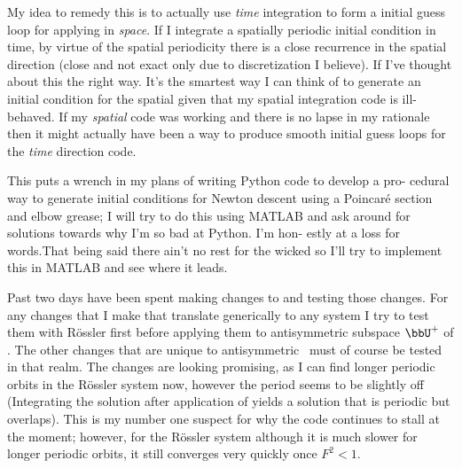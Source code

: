 My idea to remedy this is to actually use \emph{time} integration to form a initial guess loop for applying {\descent} in \emph{space}. If I integrate a spatially periodic initial condition in time, by virtue of the spatial periodicity there is a close recurrence in the spatial direction (close and not exact only due to discretization I believe). If I've thought about this the right way. It's the smartest way I can think of to generate an initial condition for the spatial {\descent}  given that my spatial integration code is ill-behaved. If my \emph{spatial} code was working and there is no lapse in my rationale then it might actually have been a way to produce smooth initial guess loops for the \emph{time} direction {\descent} code.


This puts a wrench in my plans of writing Python code to develop a pro-
cedural way to generate initial conditions for Newton descent using a
Poincaré section and elbow grease; I will try to do this using MATLAB
and ask around for solutions towards why I’m so bad at Python. I’m hon-
estly at a loss for words.That being said there ain’t no rest for the wicked
so I’ll try to implement this in MATLAB and see where it leads.

Past two days have been spent making changes to {\descent} and testing
those changes. For any changes that I make that translate generically to
any system I try to test them with R\"ossler first before applying them
to antisymmetric subspace $\bbU^+$ of \KS. The other changes that are
unique to antisymmetric \KS\ must of course be tested in that realm. The
changes are looking promising, as I can find longer periodic orbits in
the R\"ossler system now, however the period seems to be slightly off
(Integrating the solution after application of {\descent} yields a
solution that is periodic but overlaps). This is my number one suspect
for why the {\descent} code continues to stall at the moment; however,
for the R\"ossler system although it is much slower for longer periodic
orbits, it still converges very quickly once $F^2 < 1$.

